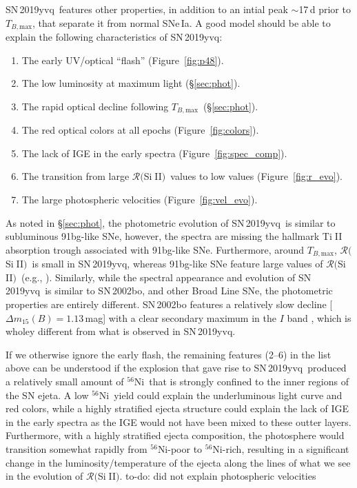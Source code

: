 \documentclass[twocolumn]{aastex63}
\def\ion#1#2{#1$\;${\footnotesize\rm{#2}}\relax}
\newcommand{\todo}[1]{{\color{magenta} to-do: {#1}}}
\newcommand{\tbmax}{$T_{B,\mathrm{max}}$}
\newcommand{\RSiII}{$\mathcal{R}($\ion{Si}{II}$)$}
\newcommand{\radni}{$^{56}$Ni}
\newcommand{\sn}{SN\,2019yvq}
\begin{document}
\sn\ features other properties, in addition to an intial peak $\sim$17\,d
prior to \tbmax, that separate it from normal SNe\,Ia. A good model should be
able to explain the following characteristics of \sn:
%
\begin{enumerate}
    \item The early UV/optical ``flash'' (Figure~\ref{fig:p48}).
    \item The low luminosity at maximum light (\S\ref{sec:phot}). 
    \item The rapid optical decline following \tbmax\ (\S\ref{sec:phot}). 
    \item The red optical colors at all epochs (Figure~\ref{fig:colors}). 
    \item The lack of IGE in the early spectra (Figure~\ref{fig:spec_comp}).
    \item The transition from large \RSiII\ values to low values (Figure~\ref{fig:r_evo}).
    \item The large photospheric velocities (Figure~\ref{fig:vel_evo}).
\end{enumerate}
%
As noted in \S\ref{sec:phot}, the photometric evolution of \sn\ is similar to
subluminous 91bg-like SNe, however, the spectra are missing the hallmark
\ion{Ti}{II} absorption trough associated with 91bg-like SNe. Furthermore,
around \tbmax, \RSiII\ is small in \sn, whereas 91bg-like SNe feature large
values of \RSiII\ (e.g., \citealt{Branch09}). Similarly, while the spectral
appearance and evolution of \sn\ is similar to SN\,2002bo, and other
\citeauthor{Branch06} Broad Line SNe, the photometric properties are entirely
different. SN\,2002bo features a relatively slow decline [$\Delta{m}_{15}(B) =
1.13$\,mag] with a clear secondary maximum in the $I$ band \citep{Benetti04},
which is wholey different from what is observed in \sn.

If we otherwise ignore the early flash, the remaining features (2--6) in the
list above can be understood if the explosion that gave rise to \sn\ produced
a relatively small amount of \radni\ that is strongly confined to the inner
regions of the SN ejeta. A low \radni\ yield could explain the underluminous
light curve and red colors, while a highly stratified ejecta structure could
explain the lack of IGE in the early spectra as the IGE would not have been
mixed to these outter layers. Furthermore, with a highly stratified ejecta
composition, the photosphere would transition somewhat rapidly from
\radni-poor to \radni-rich, resulting in a significant change in the
luminosity/temperature of the ejecta along the lines of what we see in the
evolution of \RSiII. \todo{did not explain photospheric velocities}
\end{document}
